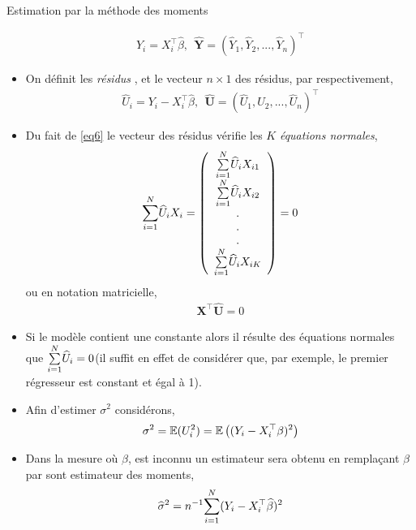 \begin{frame}[allowframebreaks]{Estimation par la méthode des moments}
\begin{itemize}
\begin{align*}
\widehat{Y}_i = X_i^\top\widehat{\beta}, \ \ \widehat{\mathbf{Y}} = (\widehat{Y}_1,  \widehat{Y}_2,..., \widehat{Y}_n)^\top
\end{align*}
\item On définit  les \emph{résidus}  , et le vecteur  $n\times 1$ des résidus, par respectivement,
\begin{align*}
\widehat{U}_i = Y_i - X_i^\top\widehat{\beta}, \ \ \widehat{\mathbf{U}} = (\widehat{U}_1,  \widehat{U}_2,..., \widehat{U}_n)^\top
\end{align*}
\item Du fait de \eqref{eq6} le vecteur des résidus vérifie les $K$  \emph{équations normales},
\begin{align}
\underset{i=1}{\overset{N}{\sum}} \widehat{U}_iX_i=
\left(
\begin{array}{c}
\underset{i=1}{\overset{N}{\sum}} \widehat{U}_iX_{i1}\\
\underset{i=1}{\overset{N}{\sum}} \widehat{U}_iX_{i2}\\
.\\
.\\
.\\
\underset{i=1}{\overset{N}{\sum}} \widehat{U}_iX_{iK}
\end{array}
\right)
=0
\label{eq10}
\end{align}
ou en notation matricielle,
\begin{align}
\mathbf{X}^\top\widehat{\mathbf{U}} = 0
\label{eq11}
\end{align}
\item Si le modèle contient une constante alors il résulte des équations normales que $\underset{i=1}{\overset{N}{\sum}} \widehat{U}_i = 0$(il suffit en effet de considérer que, par exemple, le premier régresseur est constant et égal à 1).
\item Afin d'estimer $\sigma^2$ considérons,
\begin{align*}
\sigma^2 = \mathbb{E}(U_i^2)=\mathbb{E}\left((Y_i - X_i^\top\beta)^2\right)
\end{align*}
\item Dans la mesure où $\beta$, est inconnu un estimateur  sera obtenu en remplaçant $\beta$ par sont estimateur des moments,
\begin{align}
\widehat{\sigma}^2 = n^{-1}\underset{i=1}{\overset{N}{\sum}}(Y_i-X_i^\top\widehat{\beta})^2
\label{eq12}
\end{align}
\end{itemize}
\end{frame}
